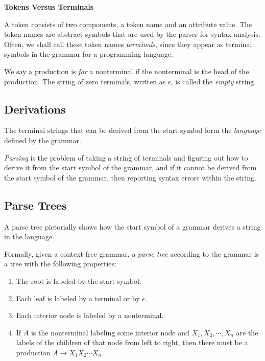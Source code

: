 \documentclass[12pt,a4paper,twoside,openany]{book}
\begin{document}
\begin{framed}
    \begin{center}
        \textbf{{\large Tokens Versus Terminals}}
    \end{center}

    A token consists of two components, a token name and an attribute value. The token names are abstract symbols that are used by the parser for syntax analysis. Often, we shall call these token names \textit{terminals}, since they appear as terminal symbols in the grammar for a programming language.
\end{framed}

We say a production is \textit{for} a nonterminal if the nonterminal is the head of the production. The string of zero terminals, written as $\epsilon$, is called the \textit{empty} string.

\subsection{Derivations}

The terminal strings that can be derived from the start symbol form the \textit{language} defined by the grammar.

\textit{Parsing} is the problem of taking a string of terminals and figuring out how to derive it from the start symbol of the grammar, and if it cannot be derived from the start symbol of the grammar, then reporting syntax errors within the string.

\subsection{Parse Trees}

A parse tree pictorially shows how the start symbol of a grammar derives a string in the language.

Formally, given a context-free grammar, a \textit{parse tree} according to the grammar is a tree with the following properties:
\begin{enumerate}
    \item The root is labeled by the start symbol.
    \item Each leaf is labeled by a terminal or by $\epsilon$.
    \item Each interior node is labeled by a nonterminal.
    \item If $A$ is the nonterminal labeling some interior node and $X_1,X_2,\cdots,X_n$ are the labels of the children of that node from left to right, then there must be a production $A\rightarrow X_1X_2\cdots X_n$.
\end{enumerate}
\end{document}
